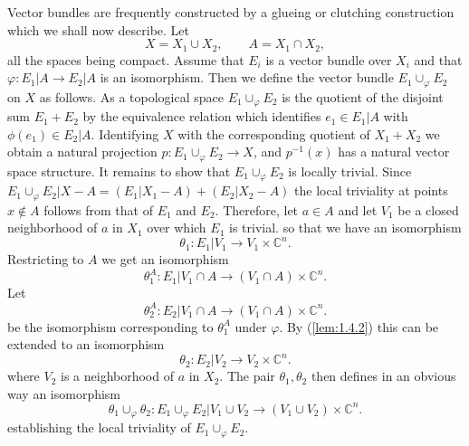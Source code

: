 Vector bundles are frequently constructed by a glueing or clutching construction which we shall now describe. Let
\begin{equation*}
    X = X_1 \cup X_2, \qquad A = X_1 \cap X_2,
\end{equation*}
all the spaces being compact. Assume that $E_i$ is a vector bundle over $X_i$ and that $\varphi: E_1 \vert A \to E_2 \vert A $ is an isomorphism. Then we define the vector bundle $E_1 \cup_\varphi E_2$ on $X$ as follows. As a topological space $E_1 \cup_\varphi E_2$ is the quotient of the disjoint sum $E_1 + E_2$ by the equivalence relation which identifies $e_1 \in E_1 \vert A$ with $\phi(e_1) \in E_2 \vert A$. Identifying $X$ with the corresponding quotient of $X_1 + X_2$ we obtain a natural projection $p: E_1 \cup_\varphi E_2 \to X$, and $p^{-1}(x)$ has a natural vector space structure. It remains to show that $E_1 \cup_\varphi E_2$ is locally trivial. Since $E_1 \cup_\varphi E_2 \vert X - A = (E_1 \vert X_1 - A) + (E_2 \vert X_2 - A)$ the local triviality at points $x \notin A$ follows from that of $E_1$ and $E_2$. Therefore, let $a \in A$ and let $V_1$ be a closed neighborhood of $a$ in $X_1$ over which $E_1$ is trivial. so that we have an isomorphism
\begin{equation*}
    \theta_1: E_1 \vert V_1 \to V_1 \times \mathbb{C}^n.
\end{equation*}
Restricting to $A$ we get an isomorphism
\begin{equation*}
    \theta_1^A: E_1 \vert V_1 \cap A \to (V_1 \cap A) \times \mathbb{C}^n.
\end{equation*}
Let
\begin{equation*}
    \theta_2^A: E_2 \vert V_1 \cap A \to (V_1 \cap A) \times \mathbb{C}^n.
\end{equation*}
be the isomorphism corresponding to $\theta_1^A$ under $\varphi$. By (\ref{lem:1.4.2}) this can be extended to an isomorphism
\begin{equation*}
    \theta_2: E_2 \vert V_2 \to V_2 \times \mathbb{C}^n.
\end{equation*}
where $V_2$ is a neighborhood of $a$ in $X_2$. The pair $\theta_1, \theta_2$ then defines in an obvious way an isomorphism
\begin{equation*}
    \theta_1 \cup_\varphi \theta_2: E_1 \cup_\varphi E_2 \vert V_1 \cup V_2 \to (V_1 \cup V_2) \times \mathbb{C}^n.
\end{equation*}
establishing the local triviality of $E_1 \cup_\varphi E_2$. \par 

